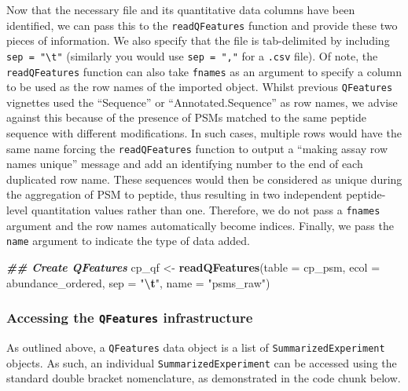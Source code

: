 \documentclass[9pt,a4paper,]{extarticle}
\newenvironment{Shaded}{\begin{snugshade}}{\end{snugshade}}
\newcommand{\AttributeTok}[1]{\textcolor[rgb]{0.13,0.29,0.53}{#1}}
\newcommand{\DocumentationTok}[1]{\textcolor[rgb]{0.56,0.35,0.01}{\textbf{\textit{#1}}}}
\newcommand{\FunctionTok}[1]{\textcolor[rgb]{0.13,0.29,0.53}{\textbf{#1}}}
\newcommand{\NormalTok}[1]{#1}
\newcommand{\OtherTok}[1]{\textcolor[rgb]{0.56,0.35,0.01}{#1}}
\newcommand{\SpecialCharTok}[1]{\textcolor[rgb]{0.81,0.36,0.00}{\textbf{#1}}}
\newcommand{\StringTok}[1]{\textcolor[rgb]{0.31,0.60,0.02}{#1}}
\begin{document}
Now that the necessary file and its quantitative data columns have been
identified, we can pass this to the \texttt{readQFeatures} function and provide these
two pieces of information. We also specify that the file is tab-delimited by
including \texttt{sep\ =\ "\textbackslash{}t"} (similarly you would use \texttt{sep\ =\ ","} for a \texttt{.csv} file).
Of note, the \texttt{readQFeatures} function can also take \texttt{fnames} as an argument to
specify a column to be used as the row names of the imported object. Whilst
previous \texttt{QFeatures} vignettes used the ``Sequence'' or ``Annotated.Sequence'' as
row names, we advise against this because of the presence of PSMs matched to the
same peptide sequence with different modifications. In such cases, multiple rows
would have the same name forcing the \texttt{readQFeatures} function to output a
``making assay row names unique'' message and add an identifying number to the end
of each duplicated row name. These sequences would then be considered as unique
during the aggregation of PSM to peptide, thus resulting in two independent
peptide- level quantitation values rather than one. Therefore, we do not pass a
\texttt{fnames} argument and the row names automatically become indices. Finally, we
pass the \texttt{name} argument to indicate the type of data added.

\begin{Shaded}
\begin{Highlighting}[]
\DocumentationTok{\#\# Create QFeatures }
\NormalTok{cp\_qf }\OtherTok{\textless{}{-}} \FunctionTok{readQFeatures}\NormalTok{(}\AttributeTok{table =}\NormalTok{ cp\_psm,}
                       \AttributeTok{ecol =}\NormalTok{ abundance\_ordered,}
                       \AttributeTok{sep =} \StringTok{"}\SpecialCharTok{\textbackslash{}t}\StringTok{"}\NormalTok{,}
                       \AttributeTok{name =} \StringTok{"psms\_raw"}\NormalTok{)}
\end{Highlighting}
\end{Shaded}

\hypertarget{accessing-the-qfeatures-infrastructure}{%
\subsubsection{\texorpdfstring{Accessing the \texttt{QFeatures} infrastructure}{Accessing the QFeatures infrastructure}}\label{accessing-the-qfeatures-infrastructure}}

As outlined above, a \texttt{QFeatures} data object is a list of \texttt{SummarizedExperiment}
objects. As such, an individual \texttt{SummarizedExperiment} can be accessed using
the standard double bracket nomenclature, as demonstrated in the code chunk
below.
\end{document}
